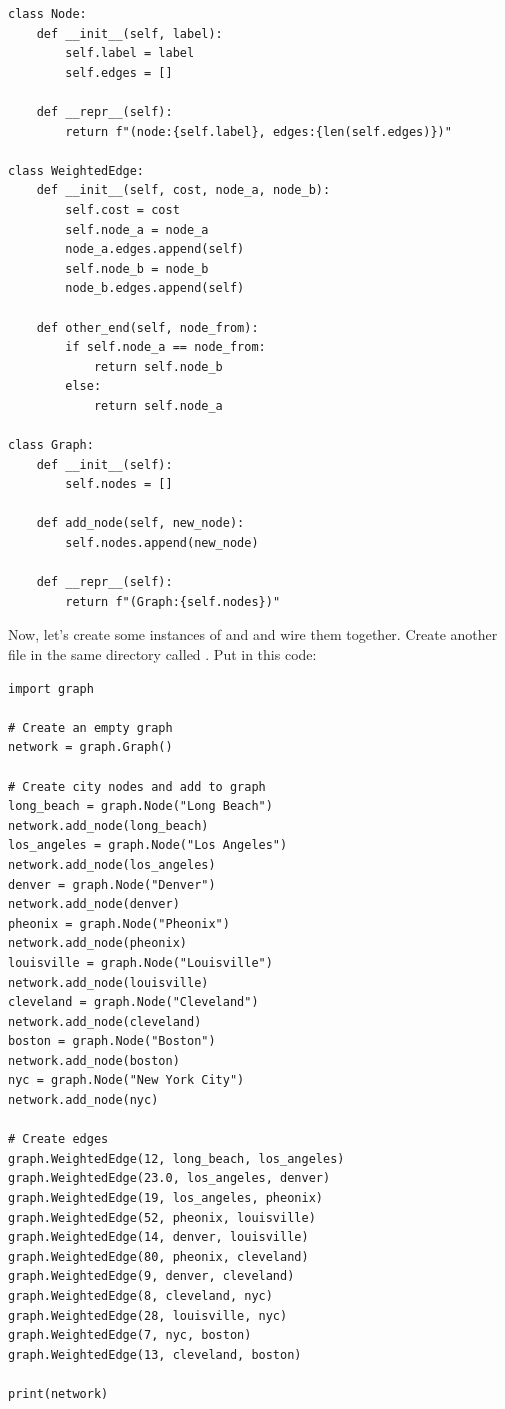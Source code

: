 \begin{verbatim}
class Node:
    def __init__(self, label):
        self.label = label
        self.edges = []

    def __repr__(self):
        return f"(node:{self.label}, edges:{len(self.edges)})"

class WeightedEdge:
    def __init__(self, cost, node_a, node_b):
        self.cost = cost
        self.node_a = node_a
        node_a.edges.append(self)
        self.node_b = node_b
        node_b.edges.append(self)

    def other_end(self, node_from):
        if self.node_a == node_from:
            return self.node_b
        else:
            return self.node_a

class Graph:
    def __init__(self):
        self.nodes = []

    def add_node(self, new_node):
        self.nodes.append(new_node)

    def __repr__(self):
        return f"(Graph:{self.nodes})"
\end{verbatim}

Now, let's create some instances of  and
 and wire them together.  Create another file in
the same directory called . Put in this code:

\begin{verbatim}
import graph

# Create an empty graph
network = graph.Graph()

# Create city nodes and add to graph
long_beach = graph.Node("Long Beach")
network.add_node(long_beach)
los_angeles = graph.Node("Los Angeles")
network.add_node(los_angeles)
denver = graph.Node("Denver")
network.add_node(denver)
pheonix = graph.Node("Pheonix")
network.add_node(pheonix)
louisville = graph.Node("Louisville")
network.add_node(louisville)
cleveland = graph.Node("Cleveland")
network.add_node(cleveland)
boston = graph.Node("Boston")
network.add_node(boston)
nyc = graph.Node("New York City")
network.add_node(nyc)

# Create edges
graph.WeightedEdge(12, long_beach, los_angeles)
graph.WeightedEdge(23.0, los_angeles, denver)
graph.WeightedEdge(19, los_angeles, pheonix)
graph.WeightedEdge(52, pheonix, louisville)
graph.WeightedEdge(14, denver, louisville)
graph.WeightedEdge(80, pheonix, cleveland)
graph.WeightedEdge(9, denver, cleveland)
graph.WeightedEdge(8, cleveland, nyc)
graph.WeightedEdge(28, louisville, nyc)
graph.WeightedEdge(7, nyc, boston)
graph.WeightedEdge(13, cleveland, boston)

print(network)
\end{verbatim}

